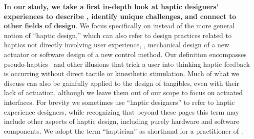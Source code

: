 \textbf{In our study, we take a first in-depth look at haptic designers' experiences to describe \haxd, identify  unique challenges, and connect \haxd to other fields of design}.
We focus specifically on \haxd instead of the more general notion of ``haptic design,'' 
which can also refer to design practices related to haptics not directly involving user experience, \eg, mechanical design of a new actuator or software design of a new control method.
Our definition encompasses pseudo-haptics~\citep{Pusch2011} and other illusions that trick a user into thinking haptic feedback is occurring without direct tactile or kinesthetic stimulation.
Much of what we discuss can also be gainfully applied to the design of tangibles, even with their lack of actuation, although we leave them out of our scope to focus on actuated interfaces.
For brevity we sometimes use ``haptic designers'' to refer to haptic experience designers, while recognizing that beyond these pages this term may include other aspects of haptic design, including purely hardware and software components. We adopt the term ``haptician'' as shorthand for a practitioner of \haxd. %


